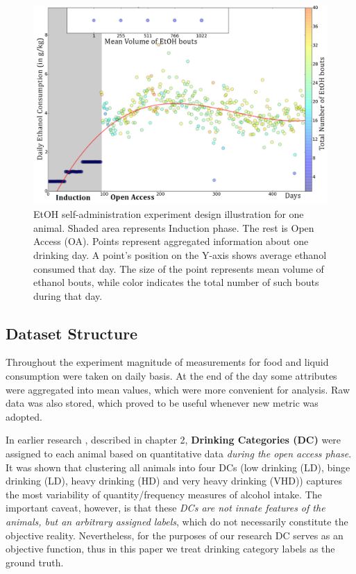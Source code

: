 	\begin{figure}[ht]
		\centering
		\includegraphics[width=1\linewidth]{figures/experiment_design.png}
		\caption{EtOH self-administration experiment design illustration for one animal. Shaded area represents Induction phase. The rest is Open Access (OA). Points represent aggregated information about one drinking day. A point's position on the Y-axis shows average ethanol consumed that day. The size of the point represents mean volume of ethanol bouts, while color indicates the total number of such bouts during that day.}
		\label{experiment_design}
	\end{figure}
	
	\subsection{Dataset Structure}
	Throughout the experiment magnitude of measurements for food and liquid consumption were taken on daily basis. At the end of the day some attributes were aggregated into mean values, which were more convenient for analysis. Raw data was also stored, which proved to be useful whenever new metric was adopted. 
	
	In earlier research , described in chapter 2, \textbf{Drinking Categories (DC)} were assigned to each animal based on quantitative data \textit{during the open access phase}. It was shown that clustering all animals into four DCs (low drinking (LD), binge drinking (LD), heavy drinking (HD) and very heavy drinking (VHD)) captures the most variability of quantity/frequency measures of alcohol intake. The important caveat, however, is that these \textit{DCs are not innate features of the animals, but an arbitrary assigned labels}, which do not necessarily constitute the objective reality. Nevertheless, for the purposes of our research DC serves as an objective function, thus in this paper we treat drinking category labels as the ground truth.
	
